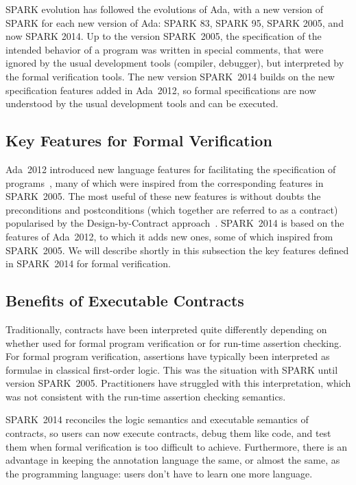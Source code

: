 \documentclass{article}
\newcommand{\oldspark}{SPARK~2005\xspace}
\newcommand{\newspark}{SPARK~2014\xspace}
\newcommand{\adatwtw}{Ada~2012\xspace}
\begin{document}
SPARK evolution has followed the evolutions of Ada, with a new version of SPARK
for each new version of Ada: SPARK 83, SPARK 95, SPARK 2005, and now SPARK
2014. Up to the version \oldspark, the specification of the intended behavior
of a program was written in special comments, that were ignored by the usual
development tools (compiler, debugger), but interpreted by the formal
verification tools. The new version \newspark builds on the new specification
features added in \adatwtw, so formal specifications are now understood by the
usual development tools and can be executed.

\subsection{Key Features for Formal Verification}

\adatwtw introduced new language features for facilitating the specification of
programs~\cite{ada2012rationale}, many of which were inspired from the
corresponding features in \oldspark. The most useful of these new features is
without doubts the preconditions and postconditions (which together are
referred to as a contract) popularised by the Design-by-Contract
approach~\cite{meyer:1988:OSC}. \newspark is based on the features of \adatwtw,
to which it adds new ones, some of which inspired from \oldspark. We will
describe shortly in this subsection the key features defined in \newspark for
formal verification.

\subsection{Benefits of Executable Contracts}

Traditionally, contracts have been interpreted quite differently depending on
whether used for formal program verification or for run-time assertion
checking. For formal program verification, assertions have typically been
interpreted as formulae in classical first-order logic. This was the situation
with SPARK until version \oldspark. Practitioners have struggled with this
interpretation, which was not consistent with the run-time assertion checking
semantics.\cite{tseChalin10}

\newspark reconciles the logic semantics and executable semantics of contracts,
so users can now execute contracts, debug them like code, and test them when
formal verification is too difficult to achieve. Furthermore, there is an
advantage in keeping the annotation language the same, or almost the same, as
the programming language: users don't have to learn one more language.
\end{document}
